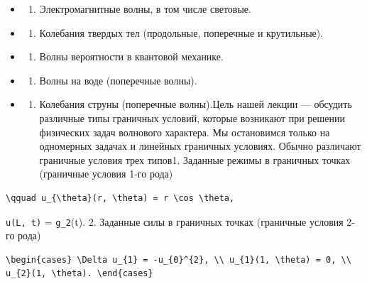 \documentclass[
  ukrainian,
]{article}
\providecommand{\tightlist}{%
  \setlength{\itemsep}{0pt}\setlength{\parskip}{0pt}}
\begin{document}
\begin{itemize}
\tightlist
\item
  \begin{enumerate}
  \def\labelenumi{\arabic{enumi}.}
  \setcounter{enumi}{1}
  \tightlist
  \item
    Электромагнитные волны, в том числе световые.
  \end{enumerate}
\item
  \begin{enumerate}
  \def\labelenumi{\arabic{enumi}.}
  \setcounter{enumi}{2}
  \tightlist
  \item
    Колебания твердых тел (продольные, поперечные и крутильные).
  \end{enumerate}
\item
  \begin{enumerate}
  \def\labelenumi{\arabic{enumi}.}
  \setcounter{enumi}{3}
  \tightlist
  \item
    Волны вероятности в квантовой механике.
  \end{enumerate}
\item
  \begin{enumerate}
  \def\labelenumi{\arabic{enumi}.}
  \setcounter{enumi}{4}
  \tightlist
  \item
    Волны на воде (поперечные волны).
  \end{enumerate}
\item
  \begin{enumerate}
  \def\labelenumi{\arabic{enumi}.}
  \setcounter{enumi}{5}
  \tightlist
  \item
    Колебания струны (поперечные волны).Цель нашей лекции --- обсудить
    различные типы граничных условий, которые возникают при решении
    физических задач волнового характера. Мы остановимся только на
    одномерных задачах и линейных граничных условиях. Обычно различают
    граничные условия трех типов1. Заданные режимы в граничных точках
    (граничные условия 1-го рода)
  \end{enumerate}
\end{itemize}

\begin{verbatim}
\qquad u_{\theta}(r, \theta) = r \cos \theta,
\end{verbatim}

\texttt{u(L,\ t)} = \texttt{g\_2}(t). 2. Заданные силы в граничных
точках (граничные условия 2-го рода)

\begin{verbatim}
\begin{cases} \Delta u_{1} = -u_{0}^{2}, \\ u_{1}(1, \theta) = 0, \\ u_{2}(1, \theta). \end{cases}
\end{verbatim}
\end{document}
